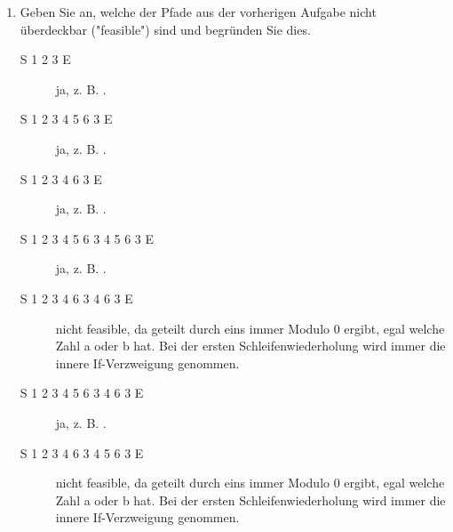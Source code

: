 \documentclass{lehramt-informatik-aufgabe}
\begin{document}
\begin{enumerate}
%

\item Geben Sie an, welche der Pfade aus der vorherigen Aufgabe nicht
überdeckbar ("feasible") sind und begründen Sie dies.

\begin{liAntwort}

\begin{description}
\item[S 1 2 3 E]
ja, z. B. .
\end{description}


\begin{description}
\item[S 1 2 3 4 5 6 3 E]
ja, z. B. .

\item[S 1 2 3 4 6 3 E]
ja, z. B. .
\end{description}


\begin{description}
\item[S 1 2 3 4 5 6 3 4 5 6 3 E]
ja, z. B. .

\item[S 1 2 3 4 6 3 4 6 3 E]
nicht feasible, da geteilt durch eins immer Modulo 0 ergibt, egal welche
Zahl a oder b hat. Bei der ersten Schleifenwiederholung wird immer die
innere If-Verzweigung genommen.

\item[S 1 2 3 4 5 6 3 4 6 3 E]
ja, z. B. .

\item[S 1 2 3 4 6 3 4 5 6 3 E]
nicht feasible, da geteilt durch eins immer Modulo 0 ergibt, egal welche
Zahl a oder b hat. Bei der ersten Schleifenwiederholung wird immer die
innere If-Verzweigung genommen.
\end{description}
\end{liAntwort}

\end{enumerate}
\end{document}
